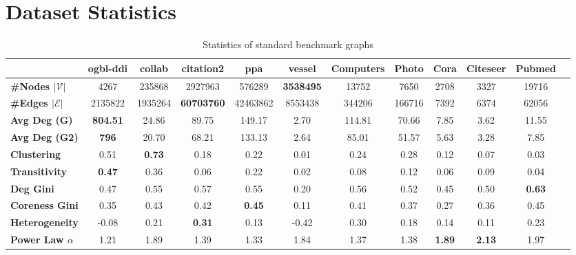 

\section{Dataset Statistics}
\begin{table*}[ht]
    \centering
    \caption{Statistics of standard benchmark graphs}
    \begin{adjustbox}{width=\textwidth}
    \begin{tabular}{lccccccccccc}
        \toprule 
        & \textbf{ogbl-ddi} & \textbf{collab} & \textbf{citation2} & \textbf{ppa} & \textbf{vessel} & \textbf{Computers} & \textbf{Photo} & \textbf{Cora} & \textbf{Citeseer} & \textbf{Pubmed} \\
        \midrule
        \textbf{\#Nodes $|\mathcal{V}|$} & 4267 & 235868 & 2927963 & 576289 & \textbf{3538495} & 13752 & 7650 & 2708 & 3327 & 19716 \\
        \textbf{\#Edges $|\mathcal{E}|$} & 2135822 & 1935264 & \textbf{60703760} & 42463862 & 8553438 & 344206 & 166716 & 7392 & 6374 & 62056 \\
        \textbf{Avg Deg (G)} & \textbf{804.51} & 24.86 & 89.75 & 149.17 & 2.70 & 114.81 & 70.66 & 7.85 & 3.62 & 11.55 \\
        \textbf{Avg Deg (G2)} & \textbf{796} & 20.70 & 68.21 & 133.13 & 2.64 & 85.01 & 51.57 & 5.63 & 3.28 & 7.85 \\
        \textbf{Clustering} & 0.51 & \textbf{0.73} & 0.18 & 0.22 & 0.01 & 0.24 & 0.28 & 0.12 & 0.07 & 0.03 \\
        \textbf{Transitivity} & \textbf{0.47} & 0.36 & 0.06 & 0.22 & 0.02 & 0.08 & 0.12 & 0.06 & 0.09 & 0.04 \\
        \textbf{Deg Gini} & 0.47 & 0.55 & 0.57 & 0.55 & 0.20 & 0.56 & 0.52 & 0.45 & 0.50 & \textbf{0.63} \\
        \textbf{Coreness Gini} & 0.35 & 0.43 & 0.42 & \textbf{0.45} & 0.11 & 0.41 & 0.37 & 0.27 & 0.36 & 0.45 \\
        \textbf{Heterogeneity} & -0.08 & 0.21 & \textbf{0.31} & 0.13 & -0.42 & 0.30 & 0.18 & 0.14 & 0.11 & 0.23 \\
        \textbf{Power Law $\alpha$} & 1.21 & 1.89 & 1.39 & 1.33 & 1.84 & 1.37 & 1.38 & \textbf{1.89} & \textbf{2.13} & 1.97 \\
        \bottomrule
    \end{tabular}
    \end{adjustbox}
    \label{tab:graph-stats}
\end{table*}


